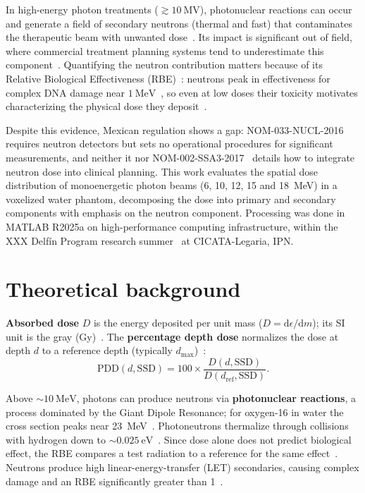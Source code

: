 \documentclass[11pt,a4paper]{article}
\begin{document}
In high-energy photon treatments (\(\gtrsim 10~\mathrm{MV}\)), photonuclear reactions
can occur and generate a field of secondary neutrons (thermal and fast) that
contaminates the therapeutic beam with unwanted dose~\cite{banaee2021}. Its impact is
significant out of field, where commercial treatment planning systems tend to
underestimate this component~\cite{kry2017tg158}. Quantifying the neutron
contribution matters because of its Relative Biological Effectiveness
(RBE)~\cite{johns1983physics}: neutrons peak in effectiveness for complex DNA damage
near \(1~\mathrm{MeV}\)~\cite{baiocco2016origin}, so even at low doses their toxicity
motivates characterizing the physical dose they deposit~\cite{kry2017tg158}.

Despite this evidence, Mexican regulation shows a gap: NOM-033-NUCL-2016
\cite{nom033_2016} requires neutron detectors but sets no operational procedures for
significant measurements, and neither it nor NOM-002-SSA3-2017~\cite{nom002ssa32017}
details how to integrate neutron dose into clinical planning. This work evaluates the
spatial dose distribution of monoenergetic photon beams (6, 10, 12, 15 and 18~MeV) in
a voxelized water phantom, decomposing the dose into primary and secondary components
with emphasis on the neutron component. Processing was done in MATLAB R2025a on
high-performance computing infrastructure, within the XXX Delf\'in Program research
summer~\cite{programadelfin2025} at CICATA-Legaria, IPN.

\section{Theoretical background}
\textbf{Absorbed dose} \(D\) is the energy deposited per unit mass
(\(D=\mathrm{d}\epsilon/\mathrm{d}m\)); its SI unit is the gray
(Gy)~\cite{attix2004dosimetry}. The \textbf{percentage depth dose} normalizes the dose
at depth \(d\) to a reference depth (typically \(d_{\max}\))~\cite{khan2014radiation}:
\begin{equation}
  \mathrm{PDD}(d,\mathrm{SSD}) = 100 \times
  \frac{D(d,\mathrm{SSD})}{D(d_{\mathrm{ref}},\mathrm{SSD})}.
\end{equation}

Above \(\sim 10~\mathrm{MeV}\), photons can produce neutrons via \textbf{photonuclear
reactions}, a process dominated by the Giant Dipole Resonance; for oxygen-16 in water
the cross section peaks near 23~MeV~\cite{geant4physref}. Photoneutrons thermalize
through collisions with hydrogen down to \(\sim
0.025~\mathrm{eV}\)~\cite{lakshmanan1982}. Since dose alone does not predict
biological effect, the RBE compares a test radiation to a reference for the same
effect~\cite{reeve2018}. Neutrons produce high linear-energy-transfer (LET)
secondaries, causing complex damage and an RBE significantly greater than
1~\cite{reeve2018}.
\end{document}

